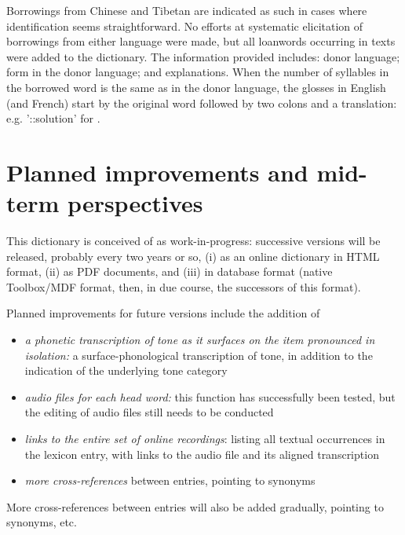 Borrowings from Chinese and Tibetan are indicated as such in cases where identification seems straightforward. No efforts at systematic elicitation of borrowings from either language were made, but all loanwords occurring in texts were added to the dictionary. The information provided includes: donor language; form in the donor language; and explanations. When the number of syllables in the borrowed word is the same as in the donor language, the glosses in English (and French) start by the original word followed by two colons and a translation: e.g. '::solution' for . 

	\section{Planned improvements and mid-term perspectives} \label{sec:improv}
	
This dictionary is conceived of as work-in-progress: successive versions will be released, probably every two years or so, (i) as an online dictionary in HTML format, (ii) as PDF documents, and (iii) in database format (native Toolbox/MDF format, then, in due course, the successors of this format). 

Planned improvements for future versions include the addition of
\begin{itemize}
	\item \textit{a phonetic transcription of tone as it surfaces on the item pronounced in isolation:} a surface-phonological transcription of tone, in addition to the indication of the underlying tone category
	\item \textit{audio files for each head word:} this function has successfully been tested, but the editing of audio files still needs to be conducted
	\item \textit{links to the entire set of online recordings}: listing all textual occurrences in the lexicon entry, with links to the audio file and its aligned transcription
	\item \textit{more cross-references} between entries, pointing to synonyms
\end{itemize}

More cross-references between entries will also be added gradually, pointing to synonyms, etc.

